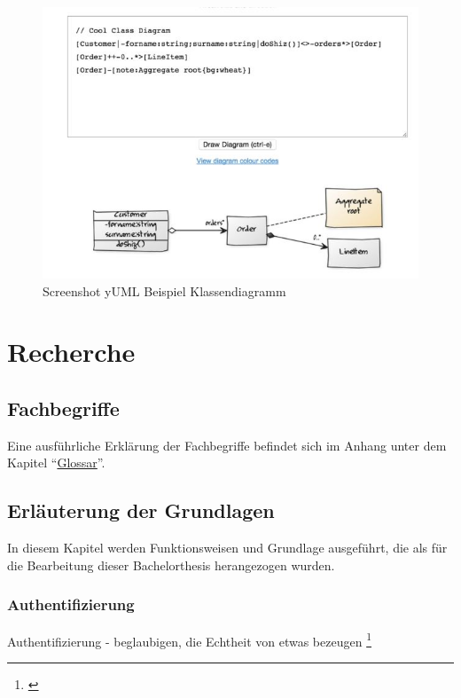 \begin{figure}[htbp]
\centering
\includegraphics{images/yuml.JPG}
\caption{Screenshot yUML Beispiel Klassendiagramm}
\end{figure}

\newpage

\chapter{Recherche}\label{recherche}

\section{Fachbegriffe}\label{fachbegriffe}

Eine ausführliche Erklärung der Fachbegriffe befindet sich im Anhang
unter dem Kapitel ``\protect\hyperlink{glossar}{Glossar}''.

\section{Erläuterung der
Grundlagen}\label{erluxe4uterung-der-grundlagen}

In diesem Kapitel werden Funktionsweisen und Grundlage ausgeführt, die
als für die Bearbeitung dieser Bachelorthesis herangezogen wurden.

\hypertarget{authentifizierung}{\subsection{Authentifizierung}\label{authentifizierung}}

Authentifizierung - beglaubigen, die Echtheit von etwas bezeugen
\footnote{\autocite{duden}}

